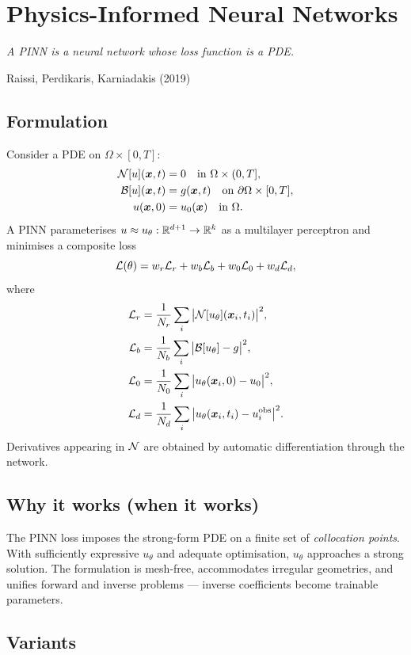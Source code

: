 \chapter{Physics-Informed Neural Networks}
\label{ch:pinns}

\epigraph{\itshape A PINN is a neural network whose loss function is a
PDE.}{Raissi, Perdikaris, Karniadakis (2019)}

\section{Formulation}
Consider a PDE on $\Omega\times[0,T]$:
\begin{align}
\mathcal{N}[u](\bm{x},t)&=0 \quad \text{in } \Omega\times(0,T],\\
\mathcal{B}[u](\bm{x},t)&=g(\bm{x},t) \quad \text{on } \partial\Omega\times[0,T],\\
u(\bm{x},0)&=u_0(\bm{x}) \quad \text{in } \Omega.
\end{align}
A PINN parameterises $u\approx u_\theta:\mathbb{R}^{d+1}\to\mathbb{R}^k$ as a multilayer
perceptron and minimises a composite loss~\cite{raissi2019pinn}
\begin{equation}
\mathcal{L}(\theta) = w_r\mathcal{L}_r + w_b\mathcal{L}_b + w_0\mathcal{L}_0 + w_d\mathcal{L}_d,
\end{equation}
where
\begin{align}
\mathcal{L}_r &=\frac{1}{N_r}\sum_i \big|\mathcal{N}[u_\theta](\bm{x}_i,t_i)\big|^2,\\
\mathcal{L}_b &=\frac{1}{N_b}\sum_i \big|\mathcal{B}[u_\theta]-g\big|^2,\\
\mathcal{L}_0 &=\frac{1}{N_0}\sum_i \big|u_\theta(\bm{x}_i,0)-u_0\big|^2,\\
\mathcal{L}_d &=\frac{1}{N_d}\sum_i \big|u_\theta(\bm{x}_i,t_i)-u_i^{\text{obs}}\big|^2.
\end{align}
Derivatives appearing in $\mathcal{N}$ are obtained by automatic
differentiation through the network.

\section{Why it works (when it works)}
The PINN loss imposes the strong-form PDE on a finite set of
\emph{collocation points}. With sufficiently expressive $u_\theta$ and
adequate optimisation, $u_\theta$ approaches a strong solution. The
formulation is mesh-free, accommodates irregular geometries, and
unifies forward and inverse problems --- inverse coefficients become
trainable parameters.

\section{Variants}
